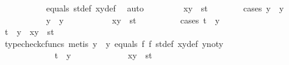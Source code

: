 \begin{isabellebody}
\ \ \ \ \ \ \ \ \ \isamarkupfalse%
\ equals\ st{\isacharunderscore}{\kern0pt}def\ xy{\isacharunderscore}{\kern0pt}def\ \isamarkupfalse%
\ auto\isanewline
\ \ \ \ \ \ \ \isamarkupfalse%
\ {\isachardoublequoteopen}{\isasymlangle}x{\isacharcomma}{\kern0pt}y{\isasymrangle}\ {\isacharequal}{\kern0pt}\ {\isasymlangle}s{\isacharcomma}{\kern0pt}t{\isasymrangle}{\isachardoublequoteclose}\isanewline
\ \ \ \ \ \ \ \isamarkupfalse%
{\isacharparenleft}{\kern0pt}cases\ {\isachardoublequoteopen}y\ {\isacharequal}{\kern0pt}\ y{}{\isachardoublequoteclose}{\isacharparenright}{\kern0pt}\ \ \isanewline
\ \ \ \ \ \ \ \ \ \isamarkupfalse%
\ {\isachardoublequoteopen}y\ {\isacharequal}{\kern0pt}\ y{}{\isachardoublequoteclose}\isanewline
\ \ \ \ \ \ \ \ \ \isamarkupfalse%
\ {\isachardoublequoteopen}{\isasymlangle}x{\isacharcomma}{\kern0pt}y{\isasymrangle}\ {\isacharequal}{\kern0pt}\ {\isasymlangle}s{\isacharcomma}{\kern0pt}t{\isasymrangle}{\isachardoublequoteclose}\isanewline
\ \ \ \ \ \ \ \ \ \isamarkupfalse%
{\isacharparenleft}{\kern0pt}cases\ {\isachardoublequoteopen}t\ {\isacharequal}{\kern0pt}\ y{}{\isachardoublequoteclose}{\isacharparenright}{\kern0pt}\isanewline
\ \ \ \ \ \ \ \ \ \ \ \isamarkupfalse%
\ {\isachardoublequoteopen}t\ {\isacharequal}{\kern0pt}\ y{}\ {\isasymLongrightarrow}\ {\isasymlangle}x{\isacharcomma}{\kern0pt}y{\isasymrangle}\ {\isacharequal}{\kern0pt}\ {\isasymlangle}s{\isacharcomma}{\kern0pt}t{\isasymrangle}{\isachardoublequoteclose}\isanewline
\ \ \ \ \ \ \ \ \ \ \ \ \ \isamarkupfalse%
\ {\isacharparenleft}{\kern0pt}typecheck{\isacharunderscore}{\kern0pt}cfuncs{\isacharcomma}{\kern0pt}\ metis\ {\isacartoucheopen}y\ {\isacharequal}{\kern0pt}\ y{}{\isacartoucheclose}\ equals\ f{}\ f{}\ st{\isacharunderscore}{\kern0pt}def\ xy{\isacharunderscore}{\kern0pt}def\ y{}{\isacharunderscore}{\kern0pt}not{\isacharunderscore}{\kern0pt}y{}{\isacharparenright}{\kern0pt}\isanewline
\ \ \ \ \ \ \ \ \ \isamarkupfalse%
\isanewline
\ \ \ \ \ \ \ \ \ \ \ \isamarkupfalse%
\ {\isachardoublequoteopen}t\ {\isasymnoteq}\ y{}{\isachardoublequoteclose}\isanewline
\ \ \ \ \ \ \ \ \ \ \ \isamarkupfalse%
\ {\isachardoublequoteopen}{\isasymlangle}x{\isacharcomma}{\kern0pt}y{\isasymrangle}\ {\isacharequal}{\kern0pt}\ {\isasymlangle}s{\isacharcomma}{\kern0pt}t{\isasymrangle}{\isachardoublequoteclose}\isanewline

\end{isabellebody}
